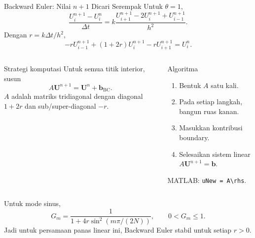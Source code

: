 \documentclass[aspectratio=169,10pt]{beamer}
\begin{document}
\begin{frame}{Backward Euler: Nilai $n+1$ Dicari Serempak}
\footnotesize
Untuk $\theta=1$,
\[
\frac{U_i^{n+1}-U_i^n}{\Delta t}
=k\frac{U_{i+1}^{n+1}-2U_i^{n+1}+U_{i-1}^{n+1}}{h^2}.
\]
Dengan $r=k\Delta t/h^2$,
\[
-rU_{i-1}^{n+1}+(1+2r)U_i^{n+1}-rU_{i+1}^{n+1}=U_i^n.
\]
\begin{columns}[T,onlytextwidth]
\begin{block}{Strategi komputasi}
Untuk semua titik interior, susun
\[
\boxed{A\mathbf U^{n+1}=\mathbf U^n+\mathbf b_{\text{BC}}}.
\]
$A$ adalah matriks tridiagonal dengan diagonal $1+2r$ dan sub/super-diagonal $-r$.
\end{block}
\begin{block}{Algoritma}
\begin{enumerate}
  \item Bentuk $A$ satu kali.
  \item Pada setiap langkah, bangun ruas kanan.
  \item Masukkan kontribusi boundary.
  \item Selesaikan sistem linear $A\mathbf U^{n+1}=\mathbf b$.
\end{enumerate}
MATLAB: \texttt{uNew = A\textbackslash rhs}.
\end{block}
\end{columns}
Untuk mode sinus,
\[
G_m=\frac{1}{1+4r\sin^2(m\pi/(2N))},\qquad 0<G_m\le1.
\]
Jadi untuk persamaan panas linear ini, Backward Euler stabil untuk setiap $r>0$.
\end{frame}
\end{document}

